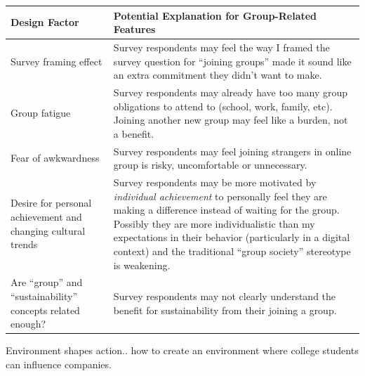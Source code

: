 \documentclass[
  12pt,
  letterpaper,
  DIV=11,
  numbers=noendperiod]{scrartcl}
\begin{document}
\begin{longtable}[]{@{}
  >{\raggedright\arraybackslash}p{}
  >{\raggedright\arraybackslash}p{}@{}}
\toprule\noalign{}
\begin{minipage}[b]{\linewidth}\raggedright
Design Factor
\end{minipage} & \begin{minipage}[b]{\linewidth}\raggedright
Potential Explanation for Group-Related Features
\end{minipage} \\
\midrule\noalign{}
\endhead
\bottomrule\noalign{}
\endlastfoot
Survey framing effect & Survey respondents may feel the way I framed the
survey question for ``joining groups'' made it sound like an extra
commitment they didn't want to make. \\
Group fatigue & Survey respondents may already have too many group
obligations to attend to (school, work, family, etc). Joining another
new group may feel like a burden, not a benefit. \\
Fear of awkwardness & Survey respondents may feel joining strangers in
online group is risky, uncomfortable or unnecessary. \\
Desire for personal achievement and changing cultural trends & Survey
respondents may be more motivated by \emph{individual achievement} to
personally feel they are making a difference instead of waiting for the
group. Possibly they are more individualistic than my expectations in
their behavior (particularly in a digital context) and the traditional
``group society'' stereotype is weakening. \\
Are ``group'' and ``sustainability'' concepts related enough? & Survey
respondents may not clearly understand the benefit for sustainability
from their joining a group. \\
\end{longtable}

Environment shapes action.. how to create an environment where college
students can influence companies.
\end{document}

